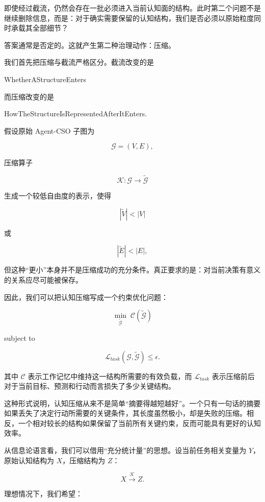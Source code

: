 即使经过截流，仍然会存在一批必须进入当前认知面的结构。此时第二个问题不是继续删除信息，而是：对于确实需要保留的认知结构，我们是否必须以原始粒度同时承载其全部细节？

答案通常是否定的。这就产生第二种治理动作：压缩。

我们首先把压缩与截流严格区分。截流改变的是

\begin{statementbox}
WhetherAStructureEnters
\end{statementbox}

而压缩改变的是

\begin{statementbox}
HowTheStructureIsRepresentedAfterItEnters.
\end{statementbox}

假设原始 Agent-CSO 子图为

\[
\mathcal G
=
(V,E),
\]

压缩算子

\[
\mathcal K:
\mathcal G
\rightarrow
\widetilde{\mathcal G}
\]

生成一个较低自由度的表示，使得

\[
|\widetilde V|
<
|V|
\]

或

\[
|\widetilde E|
<
|E|,
\]

但这种“更小”本身并不是压缩成功的充分条件。真正要求的是：对当前决策有意义的关系应尽可能被保存。

因此，我们可以把认知压缩写成一个约束优化问题：

\[
\boxed{
\min_{\widetilde{\mathcal G}}
\;
\mathcal C(\widetilde{\mathcal G})
}
\]

subject to

\[
\mathcal L_{task}
\left(
\mathcal G,
\widetilde{\mathcal G}
\right)
\leq
\epsilon.
\]

其中 $\mathcal C$ 表示工作记忆中维持这一结构所需要的有效负载，而 $\mathcal L_{task}$ 表示压缩前后对于当前目标、预测和行动而言损失了多少关键结构。

这种形式说明，认知压缩从来不是简单“摘要得越短越好”。一个只有一句话的摘要如果丢失了决定行动所需要的关键条件，其长度虽然极小，却是失败的压缩。相反，一个相对较长的结构如果保留了当前所有关键约束，反而可能具有更好的认知效率。

从信息论语言看，我们可以借用“充分统计量”的思想。设当前任务相关变量为 $Y$，原始认知结构为 $X$，压缩结构为 $Z$：

\[
X
\xrightarrow{\mathcal K}
Z.
\]

理想情况下，我们希望：

